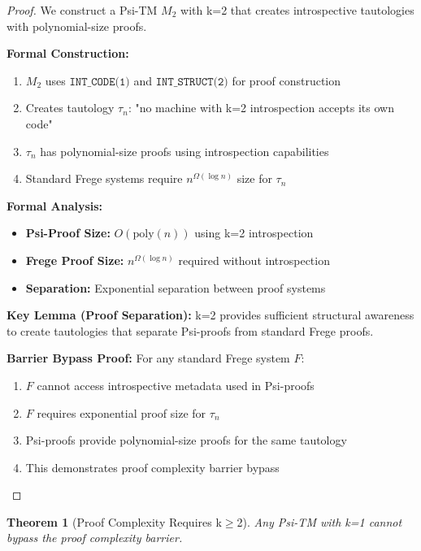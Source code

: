 \documentclass[11pt]{article}
\newtheorem{theorem}{Theorem}
\begin{document}
\begin{proof}
We construct a Psi-TM $M_2$ with k=2 that creates introspective tautologies with polynomial-size proofs.

\textbf{Formal Construction:}
\begin{enumerate}
\item $M_2$ uses $\texttt{INT\_CODE(1)}$ and $\texttt{INT\_STRUCT(2)}$ for proof construction
\item Creates tautology $\tau_n$: "no machine with k=2 introspection accepts its own code"
\item $\tau_n$ has polynomial-size proofs using introspection capabilities
\item Standard Frege systems require $n^{\Omega(\log n)}$ size for $\tau_n$
\end{enumerate}

\textbf{Formal Analysis:}
\begin{itemize}
\item \textbf{Psi-Proof Size:} $O(\text{poly}(n))$ using k=2 introspection
\item \textbf{Frege Proof Size:} $n^{\Omega(\log n)}$ required without introspection
\item \textbf{Separation:} Exponential separation between proof systems
\end{itemize}

\textbf{Key Lemma (Proof Separation):} k=2 provides sufficient structural awareness to create tautologies that separate Psi-proofs from standard Frege proofs.

\textbf{Barrier Bypass Proof:}
For any standard Frege system $F$:
\begin{enumerate}
\item $F$ cannot access introspective metadata used in Psi-proofs
\item $F$ requires exponential proof size for $\tau_n$
\item Psi-proofs provide polynomial-size proofs for the same tautology
\item This demonstrates proof complexity barrier bypass
\end{enumerate}
\end{proof}

\begin{theorem}[Proof Complexity Requires k$\geq$2]
\label{thm:proof-complexity-k1}
Any Psi-TM with k=1 cannot bypass the proof complexity barrier.
\end{theorem}
\end{document}
